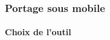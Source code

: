         \begin{frame}
            \frametitle{Portage sous mobile}
            \framesubtitle{Choix de l'outil}
            \begin{columns}
                \begin{column}{.33\linewidth}
                \end{column}
                \begin{column}{.33\linewidth}
                \end{column}
                \begin{column}{.33\linewidth}

\end{column}
\end{columns}
\end{frame}
